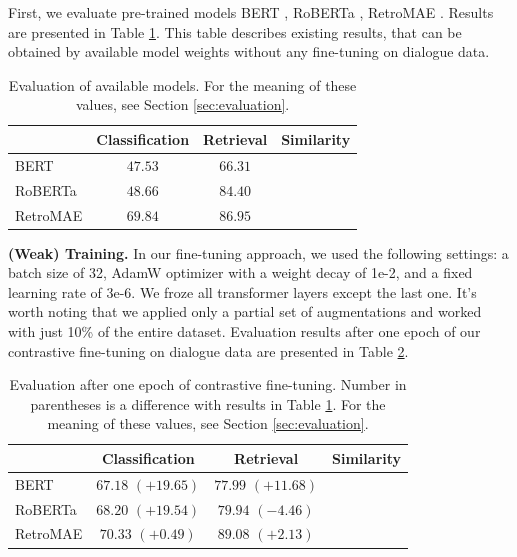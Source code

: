 \documentclass{article}
\begin{document}
First, we evaluate pre-trained models BERT \cite{devlin2019bert}, RoBERTa \cite{liu2019roberta}, RetroMAE \cite{xiao2022retromae}. Results are presented in Table \ref{tab:eval-raw}. This table describes existing results, that can be obtained by available model weights without any fine-tuning on dialogue data. 

\begin{table}[!htb]
    \centering
\begin{tabular}{l|c|c|c}
         & Classification & Retrieval & Similarity \\ \hline
BERT     & $47.53$          & $66.31$     &            \\
RoBERTa  & $48.66$          & $84.40$     &            \\
RetroMAE & $69.84$          & $86.95$     &            \\
\end{tabular}
    \caption{Evaluation of available models. For the meaning of these values, see Section \ref{sec:evaluation}.}
    \label{tab:eval-raw}
\end{table}

\textbf{(Weak) Training.} In our fine-tuning approach, we used the following settings: a batch size of 32, AdamW optimizer with a weight decay of 1e-2, and a fixed learning rate of 3e-6. We froze all transformer layers except the last one. It's worth noting that we applied only a partial set of augmentations and worked with just 10\% of the entire dataset. Evaluation results after one epoch of our contrastive fine-tuning on dialogue data are presented in Table \ref{tab:eval-one-epoch}.

\begin{table}[!htb]
    \centering
\begin{tabular}{l|c|c|c}
         & Classification & Retrieval      & Similarity \\ \hline
BERT     & $67.18$ $(+19.65)$ & $77.99$ $(+11.68)$ &            \\
RoBERTa  & $68.20$ $(+19.54)$ & $79.94$ $(-4.46)$  &            \\
RetroMAE & $70.33$ $(+0.49)$  & $89.08$ $(+2.13)$  &           
\end{tabular}
    \caption{Evaluation after one epoch of contrastive fine-tuning. Number in parentheses is a difference with results in Table \ref{tab:eval-raw}. For the meaning of these values, see Section \ref{sec:evaluation}.}
    \label{tab:eval-one-epoch}
\end{table}
\end{document}
